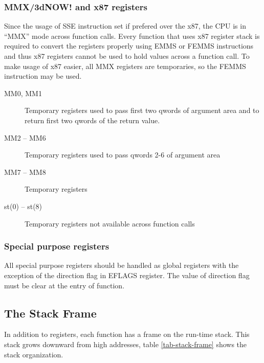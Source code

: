 \subsubsection {MMX/3dNOW! and x87 registers}
Since the usage of SSE instruction set if prefered over the x87, the CPU is in
``MMX'' mode across function calls. Every function that uses x87 register
stack is required to convert the registers properly using EMMS or FEMMS
instructions and thus x87 registers cannot be used to hold values across a
function call.  To make usage of x87 easier, all MMX registers are temporaries,
so the FEMMS instruction may be used.
\begin{description}
\item [MM0, MM1] Temporary registers used to pass first two qwords of
  argument area and to return first two qwords of the return value.
\item [MM2 -- MM6] Temporary registers used to pass qwords 2-6 of argument area
\item [MM7 -- MM8] Temporary registers
\item [st(0) -- st(8)] Temporary registers not available across function calls
\end{description}


\subsubsection {Special purpose registers}
All special purpose registers should be handled as global registers with
the exception of the direction flag in EFLAGS register.  The value of direction
flag must be clear at the entry of function.

\subsection{The Stack Frame}
In addition to registers, each function has a frame on the run-time stack.  This
stack grows downward from high addresses, table \ref{tab-stack-frame} shows the
stack organization.

